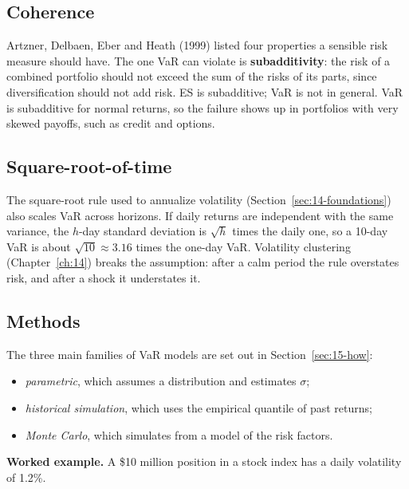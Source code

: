 \subsection{Coherence}

Artzner, Delbaen, Eber and Heath (1999) listed four properties a sensible risk measure should have. The one VaR can violate is \textbf{subadditivity}: the risk of a combined portfolio should not exceed the sum of the risks of its parts, since diversification should not add risk. ES is subadditive; VaR is not in general. VaR is subadditive for normal returns, so the failure shows up in portfolios with very skewed payoffs, such as credit and options.

\subsection{Square-root-of-time}

The square-root rule used to annualize volatility (Section~\ref{sec:14-foundations}) also scales VaR across horizons. If daily returns are independent with the same variance, the $h$-day standard deviation is $\sqrt{h}$ times the daily one, so a 10-day VaR is about $\sqrt{10} \approx 3.16$ times the one-day VaR. Volatility clustering (Chapter~\ref{ch:14}) breaks the assumption: after a calm period the rule overstates risk, and after a shock it understates it.

\subsection{Methods}

The three main families of VaR models are set out in Section~\ref{sec:15-how}:

\begin{itemize}
  \item \emph{parametric}, which assumes a distribution and estimates $\sigma$;
  \item \emph{historical simulation}, which uses the empirical quantile of past returns;
  \item \emph{Monte Carlo}, which simulates from a model of the risk factors.
\end{itemize}

\textbf{Worked example.} A \$10 million position in a stock index has a daily volatility of 1.2\%.

